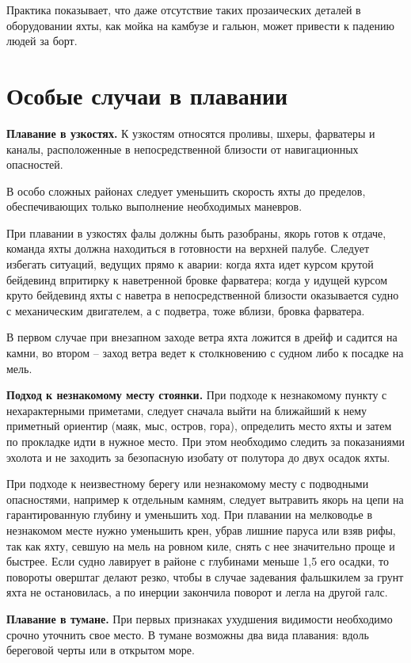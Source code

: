 Практика показывает, что даже отсутствие таких прозаических деталей в оборудовании яхты, как мойка на камбузе и гальюн, может привести к падению людей за борт.

\section{Особые случаи в плавании}

\textbf{Плавание в узкостях.} К узкостям относятся проливы, шхеры, фарватеры и каналы, расположенные в непосредственной близости от навигационных опасностей.

В особо сложных районах следует уменьшить скорость яхты до пределов, обеспечивающих только выполнение необходимых маневров.

При плавании в узкостях фалы должны быть разобраны, якорь готов к отдаче, команда яхты должна находиться в готовности на верхней палубе. Следует избегать ситуаций, ведущих прямо к аварии: когда яхта идет курсом крутой бейдевинд впритирку к наветренной бровке фарватера; когда у идущей курсом круто бейдевинд яхты с наветра в непосредственной близости оказывается судно с механическим двигателем, а с подветра, тоже вблизи, бровка фарватера.

В первом случае при внезапном заходе ветра яхта ложится в дрейф и садится на камни, во втором \--- заход ветра ведет к столкновению с судном либо к посадке на мель.

\textbf{Подход к незнакомому месту стоянки.} При подходе к незнакомому пункту с нехарактерными приметами, следует сначала выйти на ближайший к нему приметный ориентир (маяк, мыс, остров, гора), определить место яхты и затем по прокладке идти в нужное место. При этом необходимо следить за показаниями эхолота и не заходить за безопасную изобату от полутора до двух осадок яхты.

При подходе к неизвестному берегу или незнакомому месту с подводными опасностями, например к отдельным камням, следует вытравить якорь на цепи на гарантированную глубину и уменьшить ход. При плавании на мелководье в незнакомом месте нужно уменьшить крен, убрав лишние паруса или взяв рифы, так как яхту, севшую на мель на ровном киле, снять с нее значительно проще и быстрее. Если судно лавирует в районе с глубинами меньше 1,5 его осадки, то повороты оверштаг делают резко, чтобы в случае задевания фальшкилем за грунт яхта не остановилась, а по инерции закончила поворот и легла на другой галс.

\textbf{Плавание в тумане.} При первых признаках ухудшения видимости необходимо срочно уточнить свое место. В тумане возможны два вида плавания: вдоль береговой черты или в открытом море.

